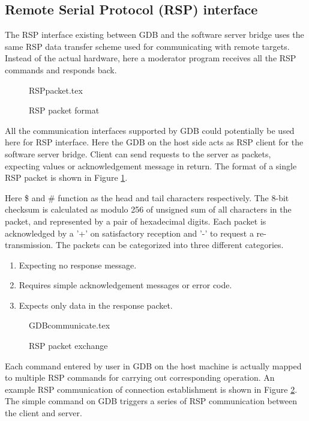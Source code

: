\subsection{Remote Serial Protocol (RSP) interface}

The RSP interface existing between GDB and the software server bridge uses the same RSP data transfer scheme used for communicating with remote targets. Instead of the actual hardware, here a moderator program receives all the RSP commands and responds back.

\begin{figure}[h!]
	\centering
	\def\svgwidth{0.8\textwidth}
	{RSPpacket.tex}
	\caption{RSP packet format}
	\label{RSPpacket}
\end{figure}

All the communication interfaces supported by GDB could potentially be used here for RSP interface. Here the GDB on the host side acts as RSP client for the software server bridge. Client can send requests to the server as packets, expecting values or acknowledgement message in return. The format of a single RSP packet is shown in Figure \ref{RSPpacket}.

Here \$ and \# function as the head and tail characters respectively. The 8-bit checksum is calculated as modulo 256 of unsigned sum of all characters in the packet, and represented by a pair of hexadecimal digits. Each packet is acknowledged by a '+' on satisfactory reception  and '-' to request a re-transmission. The packets can be categorized into three different categories.

\begin{enumerate}
	\item Expecting no response message.
	\item Requires simple acknowledgement messages or error code.
	\item Expects only data in the response packet.
\end{enumerate}

\vspace*{65mm}
\begin{figure}[h!]
	\def\svgwidth{55mm}
	\hspace{3cm}
	{GDBcommunicate.tex}
	\caption{RSP packet exchange}
	\label{gdbRSP}
\end{figure}

Each command entered by user in GDB on the host machine is actually mapped to multiple RSP commands for carrying out corresponding operation. An example RSP communication of connection establishment is shown in Figure \ref{gdbRSP}. The simple command on GDB triggers a series of RSP communication between the client and server. 

